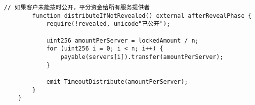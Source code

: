 \begin{lstlisting}[language=Solidity]
        // 如果客户未能按时公开，平分资金给所有服务提供者
        function distributeIfNotRevealed() external afterRevealPhase {
            require(!revealed, unicode"已公开");
    
            uint256 amountPerServer = lockedAmount / n;
            for (uint256 i = 0; i < n; i++) {
                payable(servers[i]).transfer(amountPerServer);
            }
    
            emit TimeoutDistribute(amountPerServer);
        }
    }
\end{lstlisting}